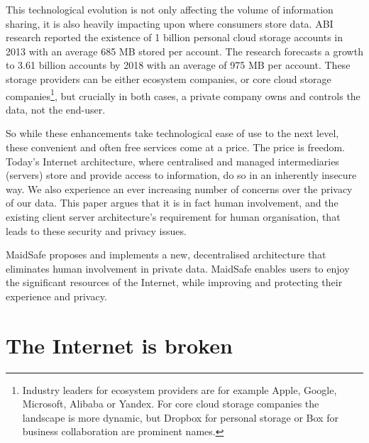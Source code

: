 \documentclass[twocolumn,english]{article}
\begin{document}
This technological evolution is not only affecting the volume of information sharing, it is also heavily impacting upon where consumers store data.
ABI research reported the existence of 1 billion personal cloud storage accounts in 2013 with an average 685 MB stored per account.  The research forecasts a growth to 3.61 billion accounts by 2018 with an average of 975 MB per account\cite{abi13}. %
These storage providers can be either ecosystem companies, or core cloud storage companies\footnote{Industry leaders for ecosystem providers are for example Apple, Google, Microsoft, Alibaba or Yandex. For core cloud storage companies the landscape is more dynamic, but Dropbox for personal storage or Box for business collaboration are prominent names.}, but crucially in both cases, a private company owns and controls the data, not the end-user.

So while these enhancements take technological ease of use to the next
level, these convenient and often free services come at a price. The
price is freedom. Today\textquoteright s Internet architecture,
where centralised and managed intermediaries (servers) store and provide
access to information, do so in an inherently insecure way. We also
experience an ever increasing number of concerns over the privacy
of our data. This paper argues that it is in fact human involvement,
and the existing client server architecture\textquoteright s requirement
for human organisation, that leads to these security and privacy issues.

MaidSafe proposes and implements a new, decentralised architecture that eliminates human involvement in private data.  MaidSafe enables users to enjoy the significant resources of the Internet, while improving and protecting their experience and privacy.


\section{The Internet is broken}
\end{document}

